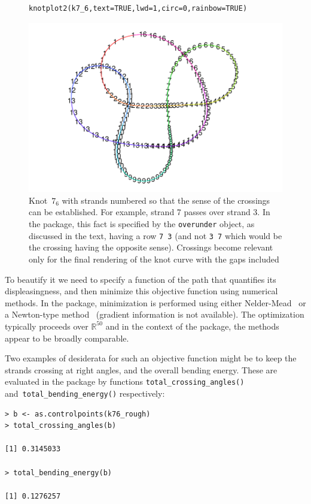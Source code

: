 \documentclass{birkjour}
\theoremstyle{definition}
\theoremstyle{remark}
\numberwithin{equation}{section}
\begin{document}
\begin{figure}[!tbp]
\begin{verbatim}
knotplot2(k7_6,text=TRUE,lwd=1,circ=0,rainbow=TRUE)
\end{verbatim}
 \centering
\includegraphics[scale = 0.9]{knot-004}
\caption{Knot~$7_6$ with strands numbered \label{k76_strands} so that
  the sense of the crossings can be established.  For example, strand
  7 passes over strand 3.  In the package, this fact is specified by
  the {\tt overunder} object, as discussed in the text, having a row
  {\tt 7 3} (and not {\tt 3 7} which would be the crossing having the
  opposite sense).  Crossings become relevant only for the final
  rendering of the knot curve with the gaps included}
\end{figure}

To beautify it we need to specify a function of the path that
quantifies its displeasingness, and then minimize this objective
function using numerical methods.  In the package, minimization is
performed using either Nelder-Mead~\cite{nelder1965} or a Newton-type
method~\cite{dennis1983} (gradient information is not available).  The
optimization typically proceeds over $\mathbb{R}^{50}$ and in the
context of the package, the methods appear to be broadly comparable.

Two examples of desiderata for such an objective function might be to
keep the strands crossing at right angles, and the overall bending
energy.  These are evaluated in the package by functions
{\tt total\_crossing\_angles()} and~{\tt total\_bending\_energy()}
respectively:

\begin{verbatim}
> b <- as.controlpoints(k76_rough)
> total_crossing_angles(b)

[1] 0.3145033

> total_bending_energy(b)

[1] 0.1276257
\end{verbatim}
\end{document}
